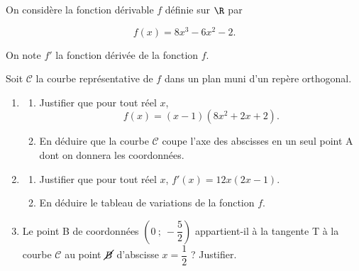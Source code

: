\medskip

On considère la fonction dérivable $f$ définie sur $\R$ par 

\[f(x) = 8x^3 - 6x^2 - 2.\]

On note $f'$ la fonction dérivée de la fonction $f$.

Soit $\mathcal{C}$ la courbe représentative de $f$ dans un plan muni d'un repère orthogonal.

\medskip

\begin{enumerate}
\item
\begin{enumerate}
\item Justifier que pour tout réel $x$, \[f(x) = (x - 1)\left( 8x^2 + 2x + 2\right).\]
\item En déduire que la courbe $\mathcal{C}$ coupe l'axe des abscisses en un seul point A dont on donnera
les coordonnées.
\end{enumerate}
\item 
	\begin{enumerate}
		\item  Justifier que pour tout réel $x$, $f'(x) = 12x(2x - 1)$.
		\item  En déduire le tableau de variations de la fonction $f$.
	\end{enumerate}
\item Le point B de coordonnées $\left(0~;~-\dfrac{5}{2}\right)$ appartient-il à la tangente T à la courbe $\mathcal{C}$ au point $\cancel{B}$
d'abscisse $x = \dfrac{1}{2}$ ? Justifier.
\end{enumerate}

\vspace{0,5cm}
